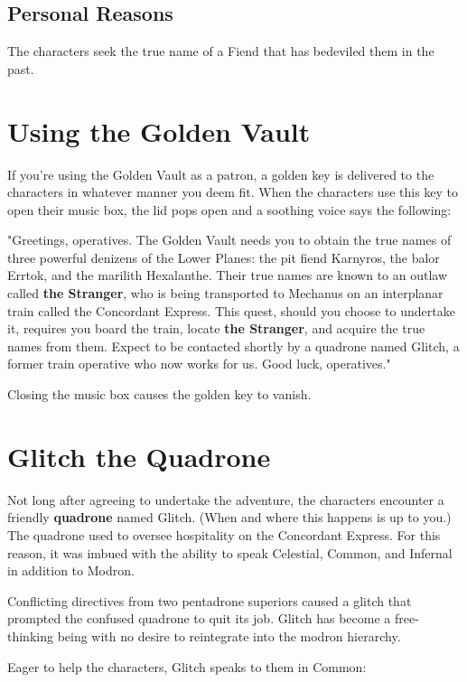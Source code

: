 \documentclass[10pt,a4paper,twoside,bg=print,twocolumn,openany,nodeprecatedcode]{dndbook}
\begin{document}
\subsection{Personal Reasons}
The characters seek the true name of a Fiend that has bedeviled them in the past.

\section{Using the Golden Vault}
If you're using the Golden Vault as a patron, a golden key is delivered to the characters in whatever manner you deem fit. When the characters use this key to open their music box, the lid pops open and a soothing voice says the following:

\begin{DndReadAloud}{}
"Greetings, operatives. The Golden Vault needs you to obtain the true names of three powerful denizens of the Lower Planes: the pit fiend Karnyros, the balor Errtok, and the marilith Hexalanthe. Their true names are known to an outlaw called \textbf{the Stranger}, who is being transported to Mechanus on an interplanar train called the Concordant Express. This quest, should you choose to undertake it, requires you board the train, locate \textbf{the Stranger}, and acquire the true names from them. Expect to be contacted shortly by a quadrone named Glitch, a former train operative who now works for us. Good luck, operatives."

\end{DndReadAloud}

Closing the music box causes the golden key to vanish.

\section{Glitch the Quadrone}
Not long after agreeing to undertake the adventure, the characters encounter a friendly \textbf{quadrone} named Glitch. (When and where this happens is up to you.) The quadrone used to oversee hospitality on the Concordant Express. For this reason, it was imbued with the ability to speak Celestial, Common, and Infernal in addition to Modron.

Conflicting directives from two pentadrone superiors caused a glitch that prompted the confused quadrone to quit its job. Glitch has become a free-thinking being with no desire to reintegrate into the modron hierarchy.

Eager to help the characters, Glitch speaks to them in Common:
\end{document}
